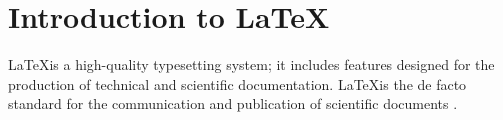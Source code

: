 \chapter{Introduction to \LaTeX}

\LaTeX is a high-quality typesetting system; it includes features designed for the production of technical and scientific documentation. \LaTeX is the de facto standard for the communication and publication of scientific documents \cite{LaTeX3Team.}.